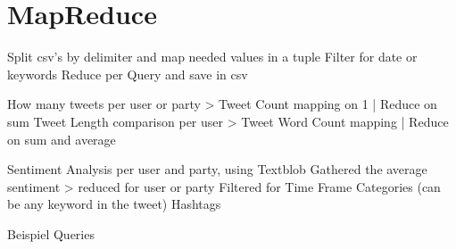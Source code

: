 \section{MapReduce}

Split csv’s by delimiter and map needed values in a tuple
Filter for date or keywords
Reduce per Query and save in csv

How many tweets per user or party
> Tweet Count mapping on 1 	| Reduce on sum
Tweet Length comparison per user
	> Tweet Word Count mapping 	| Reduce on sum and average




Sentiment Analysis per user and party, using Textblob
Gathered the average sentiment > reduced for user or party
Filtered for
Time Frame
Categories (can be any keyword in the tweet)
Hashtags

Beispiel Queries
